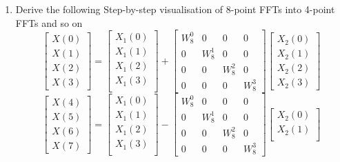 \documentclass[journal,12pt,twocolumn]{IEEEtran}
\renewcommand\thesection{\arabic{section}}
\begin{document}
\begin{enumerate}[label=\thesection.\arabic*]
\item Derive the following Step-by-step visualisation  of
8-point FFTs into 4-point FFTs and so on
\begin{equation}
\begin{bmatrix}
X(0) \\ 
X(1) \\ 
X(2) \\ 
X(3)
\end{bmatrix}
=
\begin{bmatrix}
X_{1}(0) \\ 
X_{1}(1)\\ 
X_{1}(2)\\
X_{1}(3)\\
\end{bmatrix}
+
\begin{bmatrix}
W^{0}_{8} & 0 & 0 & 0\\
0 & W^{1}_{8} & 0 & 0\\
0 & 0 & W^{2}_{8} & 0\\
0 & 0 & 0 & W^{3}_{8}
\end{bmatrix}
\begin{bmatrix}
X_{2}(0) \\ 
X_{2}(1) \\ 
X_{2}(2) \\
X_{2}(3)
\end{bmatrix}
\label{eq:8-low}
\end{equation}
\begin{equation}
\begin{bmatrix}
X(4) \\ 
X(5) \\ 
X(6) \\ 
X(7)
\end{bmatrix}
=
\begin{bmatrix}
X_{1}(0) \\ 
X_{1}(1)\\ 
X_{1}(2)\\
X_{1}(3)\\
\end{bmatrix}
-
\begin{bmatrix}
W^{0}_{8} & 0 & 0 & 0\\
0 & W^{1}_{8} & 0 & 0\\
0 & 0 & W^{2}_{8} & 0\\
0 & 0 & 0 & W^{3}_{8}
\end{bmatrix}
\begin{bmatrix}
X_{2}(0) \\ 
X_{2}(1) \\ 

\end{bmatrix}
\end{equation}
\end{enumerate}
\end{document}
